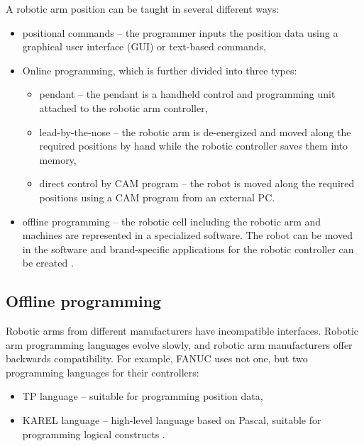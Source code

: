 A robotic arm position can be taught in several different ways:

\begin{itemize}
    \item positional commands -- the programmer inputs the position data using a graphical user interface (GUI) or text-based commands,
    
    \item Online programming, which is further divided into three types:
    
    \begin{itemize}
    
    \item pendant -- the pendant is a handheld control and programming unit attached to the robotic arm controller,
    \item lead-by-the-nose -- the robotic arm is de-energized and moved along the required positions by hand while the robotic controller saves them into memory,
    \item direct control by CAM program -- the robot is moved along the required positions using a CAM program from an external PC.
    
    \end{itemize}
    
    \item offline programming -- the robotic cell including the robotic arm and machines are represented in a specialized software. The robot can be moved in the software and brand-specific applications for the robotic controller can be created \cite{robodkmethods}.
  

\end{itemize}

\subsection{Offline programming}
Robotic arms from different manufacturers have incompatible interfaces. Robotic arm programming languages evolve slowly, and robotic arm manufacturers offer backwards compatibility. For example, FANUC uses not one, but two programming languages for their controllers: 

\begin{itemize}

 \item TP language -- suitable for programming position data,
 \item KAREL language -- high-level language based on Pascal, suitable for programming logical constructs \cite{fanuchandling}.

\end{itemize}

